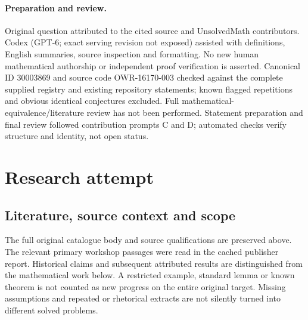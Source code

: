 \documentclass[11pt]{article}
\begin{document}
\paragraph{Preparation and review.}
Original question attributed to the cited source and UnsolvedMath contributors. Codex (GPT-6; exact serving revision not exposed) assisted with definitions, English summaries, source inspection and formatting. No new human mathematical authorship or independent proof verification is asserted. Canonical ID 30003869 and source code OWR-16170-003 checked against the complete supplied registry and existing repository statements; known flagged repetitions and obvious identical conjectures excluded. Full mathematical-equivalence/literature review has not been performed. Statement preparation and final review followed contribution prompts C and D; automated checks verify structure and identity, not open status.
\label{end:30003869}

\section{Research attempt}
\subsection{Literature, source context and scope}
The full original catalogue body and source qualifications are preserved above. The relevant primary workshop passages were read in the cached publisher report. Historical claims and subsequent attributed results are distinguished from the mathematical work below. A restricted example, standard lemma or known theorem is not counted as new progress on the entire original target. Missing assumptions and repeated or rhetorical extracts are not silently turned into different solved problems.
\end{document}
